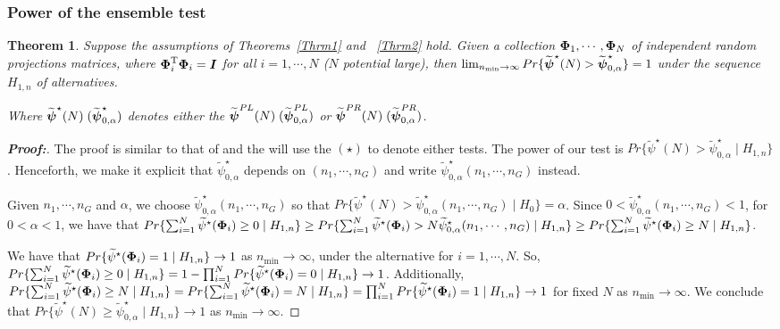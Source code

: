 \documentclass[times,sort&compress,3p]{elsarticle}
\theoremstyle{plain}%
\newtheorem{theorem}{Theorem}
\theoremstyle{definition}
\def\boldpsi{{\mbox{\boldmath $\psi$}}}
\def\trans{^{\rm T}}
\newcommand{\uI}       {\mbox{\boldmath$I$}}
\newcommand{\uPhi}              {\mbox{\boldmath$\Phi$}}
\begin{document}
\subsubsection{Power of the ensemble test}
\begin{theorem}
Suppose the assumptions of Theorems~\ref{Thrm1} and ~\ref{Thrm2} hold.
Given a collection $\uPhi_1, \cdots, \uPhi_N$ of independent random projections matrices,
where $\uPhi_{i}\trans\uPhi_{i} = \uI$ for all $i = 1, \cdots, N$ ($N$ potential large), then $\lim_{n_{\min} \rightarrow \infty} Pr\{\widetilde{\boldpsi}^{\star}(N) > \widetilde{\boldpsi}^{\star}_{0,\alpha}\}  = 1$ under the sequence $H_{1,n}$ of alternatives.

Where $\widetilde{\boldpsi}^{\star}(N)\;(\widetilde{\boldpsi}^{\star}_{0,\alpha})$ denotes either the $\widetilde{\boldpsi}^{PL}(N)\; (\widetilde{\boldpsi}^{PL}_{0,\alpha})$ or $\widetilde{\boldpsi}^{PR}(N)\;(\widetilde{\boldpsi}^{PR}_{0,\alpha})$. 
\end{theorem}
\begin{proof}[\textbf{\upshape Proof:}]
The proof is similar to that of \citealp{zoh2018powerful} and the will use the $(\star)$ to denote either tests.  
The power of our test is $Pr\{ \widetilde{\psi}^{\star}(N) > \widetilde{\psi}^{\star}_{0,\alpha}\mid  H_{1,n}\}$.
Henceforth, we make it explicit that $\widetilde{\psi}^{\star}_{0,\alpha}$ depends on $(n_1, \cdots ,n_G)$ and write $\widetilde{\psi}^{\star}_{0,\alpha}(n_1, \cdots, n_G)$ instead.

Given $n_1, \cdots, n_G$ and $\alpha$, we choose $\widetilde{\psi}^{\star}_{0,\alpha}(n_1, \cdots, n_G)$ so that $Pr\{\widetilde{\psi}^{\star}(N) > \widetilde{\psi}^{\star}_{0, \alpha}(n_1, \cdots,n_G)\mid  H_{0}\}  = \alpha$.
Since $ 0 < \widetilde{\psi}^{\star}_{0,\alpha}(n_1, \cdots,n_G) < 1$, for $0 < \alpha < 1$, we have that $Pr\{ \sum^{N}_{i=1}\widetilde{\psi}^{\star}(\uPhi_i) \geq 0 \mid H_{1,n} \} \geq Pr\{ \sum^{N}_{i=1}\widetilde{\psi}^{\star}(\uPhi_i) > N\widetilde{\psi}^{\star}_{0,\alpha}(n_1, \cdots ,n_G) \mid H_{1,n} \} \geq Pr\{ \sum^{N}_{i=1}\widetilde{\psi}^{\star}(\uPhi_i) \geq N \mid H_{1,n} \}$.

We have that $Pr\{\widetilde{\psi}^{\star}(\uPhi_i) =1 \mid H_{1,n}\} \rightarrow 1$ as $n_{\min} \rightarrow \infty$, under the alternative for $i = 1, \cdots, N$. So, $Pr\{ \sum^{N}_{i=1}\widetilde{\psi}^{\star}(\uPhi_i) \geq 0 \mid H_{1,n} \} = 1 - \prod_{i=1}^{N}Pr\{\widetilde{\psi}^{\star}(\uPhi_i) = 0 \mid H_{1,n} \} \rightarrow 1$.
Additionally, $Pr\{ \sum^{N}_{i=1}\widetilde{\psi}^{\star}(\uPhi_i) \geq N \mid H_{1,n} \} = Pr\{ \sum^{N}_{i=1}\widetilde{\psi}^{\star}(\uPhi_i) = N \mid H_{1,n} \} = \prod_{i=1}^{N}Pr\{\widetilde{\psi}^{\star}(\uPhi_i) = 1 \mid H_{1,n}\} \rightarrow 1$ for fixed $N$ as $n_{\min} \rightarrow \infty$. We conclude that $Pr\{ \widetilde{\psi}^{\star}(N) \geq \widetilde{\psi}^{\star}_{0, \alpha}\mid  H_{1,n}\} \rightarrow 1$ as $n_{\min} \rightarrow \infty.$
\end{proof}
\end{document}
